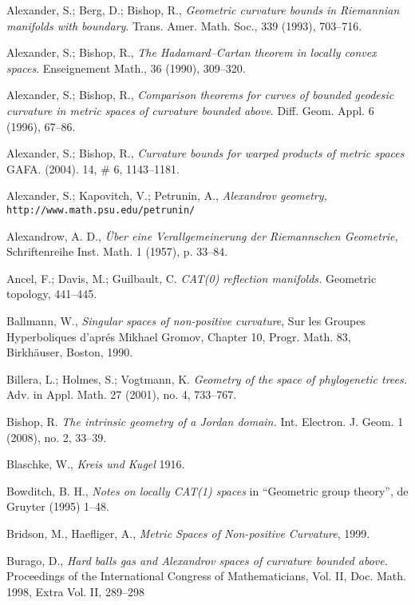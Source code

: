\begin{thebibliography}{52}

Alexander, S.; Berg, D.; Bishop, R., 
\textit{Geometric curvature bounds in Riemannian manifolds with boundary}. 
Trans. Amer. Math. Soc., 339 (1993), 703--716.

Alexander, S.; 
Bishop, R., 
\textit{The Hadamard--Cartan theorem in locally convex spaces}. 
Enseignement Math., 
36 
(1990), 
309--320.

 Alexander, S.; Bishop, R., 
\textit{Comparison theorems for curves of bounded geodesic curvature in metric spaces of curvature bounded above}.
Diff. Geom. Appl. 
6 
(1996), 
67--86.

Alexander, S.; 
Bishop, R., 
\textit{Curvature bounds for warped products of metric spaces}
GAFA. 
(2004). 
14, 
\# 6, 
1143--1181.

Alexander, S.;
Kapovitch, V.;
Petrunin, A.,
\textit{Alexandrov geometry,}
 \texttt{http://www.math.psu.edu/petrunin/}

 Alexandrow, A. D.,  \textit{\"Uber eine Verallgemeinerung der Riemannschen Geometrie,}
Schriftenreihe Inst. Math. 
1 
(1957), 
p. 33--84.

 Ancel, F.; Davis, M.; Guilbault, C.
\textit{CAT(0) reflection manifolds.} 
Geometric topology, 
441--445.

Ballmann, W., 
\textit{Singular spaces of non-positive curvature}, 
Sur les Groupes Hyperboliques d'apr\'{e}s Mikhael Gromov, Chapter 10, Progr. Math. 83, Birkh\"auser, Boston, 1990. 

Billera, L.; 
Holmes, S.; 
Vogtmann, K. 
\textit{Geometry of the space of phylogenetic trees.}
Adv. in Appl. Math. 
27 
(2001), 
no. 4, 
733--767.

Bishop, R. 
\textit{The intrinsic geometry of a Jordan domain.} 
Int. Electron. J. Geom. 
1 
(2008), 
no. 2, 
33--39.

Blaschke, W., 
\textit{Kreis und Kugel} 1916.

Bowditch, B. H.,
\textit{Notes on locally CAT(1) spaces} 
in ``Geometric group theory'', 
de Gruyter (1995) 1--48.

Bridson, M., 
Haefliger, A.,
\textit{Metric Spaces of Non-positive Curvature}, 1999.

Burago, D., 
\textit{Hard balls gas and Alexandrov spaces of curvature bounded above.} 
Proceedings of the International Congress of Mathematicians, Vol. II, 
Doc. Math. 1998, 
Extra Vol. II, 
289--298


\end{thebibliography}
